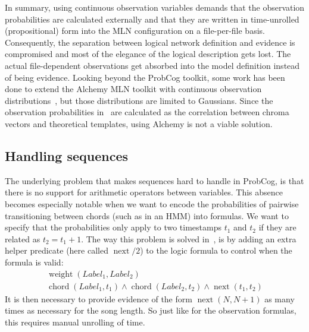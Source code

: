 \documentclass[letterpaper]{article} %
\begin{document}
In summary, using continuous observation variables demands that the observation probabilities are calculated externally and that they are written in time-unrolled (propositional) form into the MLN configuration on a file-per-file basis. Consequently, the separation between logical network definition and evidence is compromised and most of the elegance of the logical description gets lost. The actual file-dependent observations get absorbed into the model definition instead of being evidence. Looking beyond the ProbCog toolkit, some work has been done to extend the Alchemy MLN toolkit with continuous observation distributions~\cite{wang2008aaai}, but those distributions are limited to Gaussians. Since the observation probabilities in~\cite{papadopoulos2012ismir,papadopoulos2013icassp,papadopoulos2017taslp} are calculated as the correlation between chroma vectors and theoretical templates, using Alchemy is not a viable solution.


\subsection{Handling sequences}

The underlying problem that makes sequences hard to handle in ProbCog, is that there is no support for arithmetic operators between variables. This absence becomes especially notable when we want to encode the probabilities of pairwise transitioning between chords (such as in an HMM) into formulas. We want to specify that the probabilities only apply to two timestamps $t_1$ and $t_2$ if they are related as $t_2=t_1+1$. The way this problem is solved in~\cite{papadopoulos2012ismir,papadopoulos2013icassp,papadopoulos2017taslp}, is by adding an extra helper predicate (here called $\operatorname{next}/2$) to the logic formula to control when the formula is valid:
\begin{multline}\label{eq:transition-formula}
\operatorname{weight}\left(Label_1,Label_2\right) \\ \operatorname{chord}\left(Label_1, t_1\right) \wedge \operatorname{chord}\left(Label_2, t_2\right) \wedge \operatorname{next}\left(t_1, t_2\right)
\end{multline}
It is then necessary to provide evidence of the form $\operatorname{next}(N,N+1)$ as many times as necessary for the song length. So just like for the observation formulas, this requires manual unrolling of time.
\end{document}

